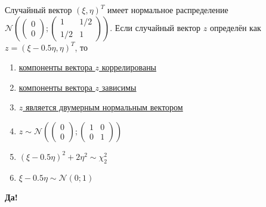 \documentclass[t]{beamer}
\newcommand{\cN}{\mathcal{N}}
\begin{document}
 \begin{frame} \label{27-Yes} 
\begin{block}{27} 

    Случайный вектор $(\xi, \eta)^T$ имеет нормальное распределение
    $\cN \left(
    \begin{pmatrix}
      0 \\
      0
    \end{pmatrix};
    \begin{pmatrix}
      1 & 1/2 \\
      1/2 & 1
    \end{pmatrix}
  \right)$. Если случайный вектор $z$ определён как $z=(\xi - 0.5\eta, \eta)^T$, то
  


 \end{block} 
\begin{enumerate} 
\item[] \hyperlink{27-No}{\beamergotobutton{} компоненты вектора $z$ коррелированы}
\item[] \hyperlink{27-No}{\beamergotobutton{} компоненты вектора $z$ зависимы}
\item[] \hyperlink{27-Yes}{\beamergotobutton{} $z$ является двумерным нормальным вектором}
\item[] \hyperlink{27-No}{\beamergotobutton{} $z \sim \cN \left(
	\begin{pmatrix}
		0 \\
		0
	\end{pmatrix};
	\begin{pmatrix}
		1 & 0 \\
		0 & 1
	\end{pmatrix}
	\right)$}
\item[] \hyperlink{27-No}{\beamergotobutton{} $(\xi - 0.5\eta)^2 + 2\eta^2 \sim \chi_2^2$}
\item[] \hyperlink{27-No}{\beamergotobutton{} $\xi - 0.5\eta \sim \cN(0;1)$}
\end{enumerate} 

 \textbf{Да!} 
 \hyperlink{28}{}\end{frame} 
\end{document}
